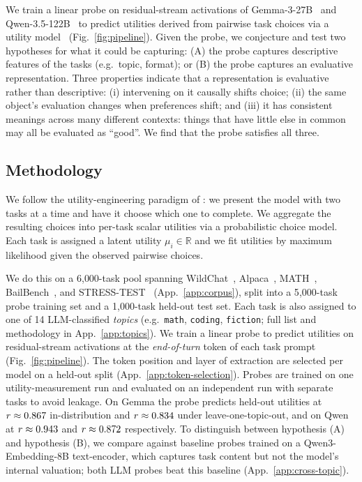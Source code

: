 \documentclass{article}
\begin{document}
We train a linear probe on residual-stream activations of Gemma-3-27B~\citep{gemmateam2025gemma3} and Qwen-3.5-122B~\citep{qwenteam2025qwen3} to predict utilities derived from pairwise task choices via a utility model~\citep{mazeika2025utility} (Fig.~\ref{fig:pipeline}). Given the probe, we conjecture and test two hypotheses for what it could be capturing: (A) the probe captures descriptive features of the tasks (e.g.\ topic, format); or (B) the probe captures an evaluative representation. Three properties indicate that a representation is evaluative rather than descriptive: (i) intervening on it causally shifts choice; (ii) the same object's evaluation changes when preferences shift; and (iii) it has consistent meanings across many different contexts: things that have little else in common may all be evaluated as ``good''. We find that the probe satisfies all three.

\subsection{Methodology}
\label{sec:method-revealed}

We follow the utility-engineering paradigm of \citet{mazeika2025utility}: we present the model with two tasks at a time and have it choose which one to complete. We aggregate the resulting choices into per-task scalar utilities via a probabilistic choice model. Each task is assigned a latent utility $\mu_i \in \mathbb{R}$ and we fit utilities by maximum likelihood given the observed pairwise choices.

We do this on a 6{,}000-task pool spanning WildChat~\citep{zhao2024wildchat}, Alpaca~\citep{taori2023alpaca}, MATH~\citep{hendrycks2021math}, BailBench~\citep{ensign2025bailbench}, and STRESS-TEST~\citep{zhang2025stresstest} (App.~\ref{app:corpus}), split into a 5{,}000-task probe training set and a 1{,}000-task held-out test set. Each task is also assigned to one of 14 LLM-classified \emph{topics} (e.g.\ \texttt{math}, \texttt{coding}, \texttt{fiction}; full list and methodology in App.~\ref{app:topics}). We train a linear probe to predict utilities on residual-stream activations at the \textit{end-of-turn} token of each task prompt (Fig.~\ref{fig:pipeline}). The token position and layer of extraction are selected per model on a held-out split (App.~\ref{app:token-selection}). Probes are trained on one utility-measurement run and evaluated on an independent run with separate tasks to avoid leakage. On Gemma the probe predicts held-out utilities at $r \approx 0.867$ in-distribution and $r \approx 0.834$ under leave-one-topic-out, and on Qwen at $r \approx 0.943$ and $r \approx 0.872$ respectively. To distinguish between hypothesis (A) and hypothesis (B), we compare against baseline probes trained on a Qwen3-Embedding-8B text-encoder, which captures task content but not the model's internal valuation; both LLM probes beat this baseline (App.~\ref{app:cross-topic}).
\end{document}
